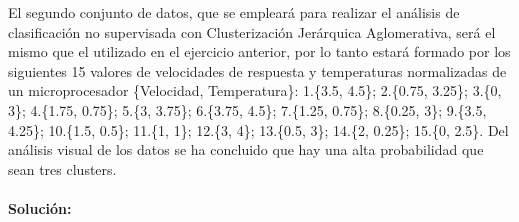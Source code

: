 \documentclass[a4paper, 12pt]{article}
\begin{document}
	El segundo conjunto de datos, que se empleará para realizar el análisis de clasificación no supervisada con Clusterización Jerárquica Aglomerativa, será el mismo que el utilizado en el ejercicio anterior, por lo tanto estará formado por los siguientes 15 valores de velocidades de respuesta y temperaturas normalizadas de un microprocesador \{Velocidad, Temperatura\}: 1.\{3.5, 4.5\}; 2.\{0.75, 3.25\}; 3.\{0, 3\}; 4.\{1.75, 0.75\}; 5.\{3, 3.75\}; 6.\{3.75, 4.5\}; 7.\{1.25, 0.75\}; 8.\{0.25, 3\}; 9.\{3.5, 4.25\}; 10.\{1.5, 0.5\}; 11.\{1, 1\}; 12.\{3, 4\}; 13.\{0.5, 3\}; 14.\{2, 0.25\}; 15.\{0, 2.5\}. Del análisis visual de los datos se ha concluido que hay una alta probabilidad que sean tres clusters.
	
	\paragraph{Solución:}
\end{document}
